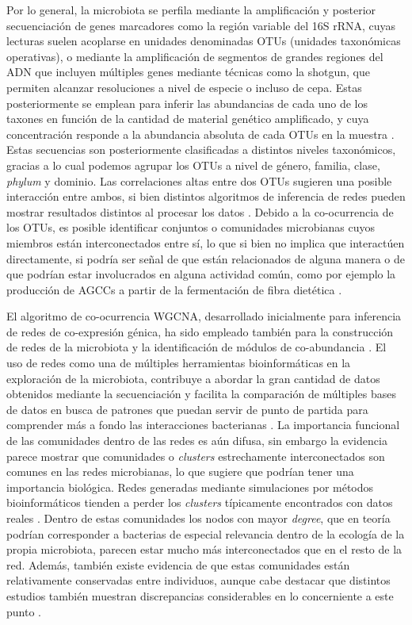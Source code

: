 \documentclass[
]{book}
\begin{document}
Por lo general, la microbiota se perfila mediante la amplificación y posterior secuenciación de genes marcadores como la región variable del 16S rRNA, cuyas lecturas suelen acoplarse en unidades denominadas OTUs (unidades taxonómicas operativas), o mediante la amplificación de segmentos de grandes regiones del ADN que incluyen múltiples genes mediante técnicas como la shotgun, que permiten alcanzar resoluciones a nivel de especie o incluso de cepa. Estas posteriormente se emplean para inferir las abundancias de cada uno de los taxones en función de la cantidad de material genético amplificado, y cuya concentración responde a la abundancia absoluta de cada OTUs en la muestra \citep{allin2018aberrant}. Estas secuencias son posteriormente clasificadas a distintos niveles taxonómicos, gracias a lo cual podemos agrupar los OTUs a nivel de género, familia, clase, \emph{phylum} y dominio. Las correlaciones altas entre dos OTUs sugieren una posible interacción entre ambos, si bien distintos algoritmos de inferencia de redes pueden mostrar resultados distintos al procesar los datos \citep{villaintroduction}. Debido a la co-ocurrencia de los OTUs, es posible identificar conjuntos o comunidades microbianas cuyos miembros están interconectados entre sí, lo que si bien no implica que interactúen directamente, si podría ser señal de que están relacionados de alguna manera o de que podrían estar involucrados en alguna actividad común, como por ejemplo la producción de AGCCs a partir de la fermentación de fibra dietética \citep{jackson2018detection}.

El algoritmo de co-ocurrencia WGCNA, desarrollado inicialmente para inferencia de redes de co-expresión génica, ha sido empleado también para la construcción de redes de la microbiota y la identificación de módulos de co-abundancia \citep{lozupone2012identifying}. El uso de redes como una de múltiples herramientas bioinformáticas en la exploración de la microbiota, contribuye a abordar la gran cantidad de datos obtenidos mediante la secuenciación y facilita la comparación de múltiples bases de datos en busca de patrones que puedan servir de punto de partida para comprender más a fondo las interacciones bacterianas \citep{guimera2005cartography}. La importancia funcional de las comunidades dentro de las redes es aún difusa, sin embargo la evidencia parece mostrar que comunidades o \emph{clusters} estrechamente interconectados son comunes en las redes microbianas, lo que sugiere que podrían tener una importancia biológica. Redes generadas mediante simulaciones por métodos bioinformáticos tienden a perder los \emph{clusters} típicamente encontrados con datos reales \citep{colizza2006detecting}. Dentro de estas comunidades los nodos con mayor \emph{degree}, que en teoría podrían corresponder a bacterias de especial relevancia dentro de la ecología de la propia microbiota, parecen estar mucho más interconectados que en el resto de la red. Además, también existe evidencia de que estas comunidades están relativamente conservadas entre individuos, aunque cabe destacar que distintos estudios también muestran discrepancias considerables en lo concerniente a este punto \citep{baldassano2016topological}.
\end{document}
